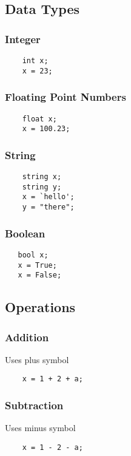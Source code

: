 \documentclass[12pt,letterpaper]{article}
\begin{document}
\subsection{Data Types}
\subsubsection{Integer}
\begin{verbatim}
    int x;
    x = 23;
\end{verbatim}

\subsubsection{Floating Point Numbers}
\begin{verbatim}
    float x;
    x = 100.23;
\end{verbatim}

\subsubsection{String}
\begin{verbatim}
    string x;
    string y;
    x = `hello';
    y = "there";
\end{verbatim}

\subsubsection{Boolean}
\begin{verbatim}
   bool x;
   x = True;
   x = False;
\end{verbatim}

\subsection{Operations}
\subsubsection{Addition}
Uses plus symbol
\begin{verbatim}
    x = 1 + 2 + a;
\end{verbatim}

\subsubsection{Subtraction}
Uses minus symbol
\begin{verbatim}
    x = 1 - 2 - a;
\end{verbatim}
\end{document}
